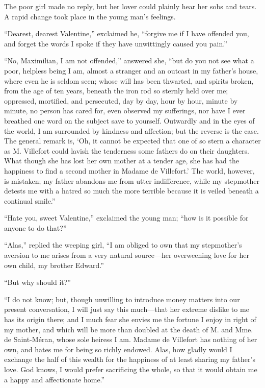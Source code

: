 The poor girl made no reply, but her lover could plainly hear her sobs
and tears. A rapid change took place in the young man’s feelings.

“Dearest, dearest Valentine,” exclaimed he, “forgive me if I have
offended you, and forget the words I spoke if they have unwittingly
caused you pain.”

“No, Maximilian, I am not offended,” answered she, “but do you not see
what a poor, helpless being I am, almost a stranger and an outcast in
my father’s house, where even he is seldom seen; whose will has been
thwarted, and spirits broken, from the age of ten years, beneath the
iron rod so sternly held over me; oppressed, mortified, and persecuted,
day by day, hour by hour, minute by minute, no person has cared for,
even observed my sufferings, nor have I ever breathed one word on the
subject save to yourself. Outwardly and in the eyes of the world, I am
surrounded by kindness and affection; but the reverse is the case. The
general remark is, ‘Oh, it cannot be expected that one of so stern a
character as M. Villefort could lavish the tenderness some fathers do
on their daughters. What though she has lost her own mother at a tender
age, she has had the happiness to find a second mother in Madame de
Villefort.’ The world, however, is mistaken; my father abandons me from
utter indifference, while my stepmother detests me with a hatred so
much the more terrible because it is veiled beneath a continual smile.”

“Hate you, sweet Valentine,” exclaimed the young man; “how is it
possible for anyone to do that?”

“Alas,” replied the weeping girl, “I am obliged to own that my
stepmother’s aversion to me arises from a very natural source—her
overweening love for her own child, my brother Edward.”

“But why should it?”

“I do not know; but, though unwilling to introduce money matters into
our present conversation, I will just say this much—that her extreme
dislike to me has its origin there; and I much fear she envies me the
fortune I enjoy in right of my mother, and which will be more than
doubled at the death of M. and Mme. de Saint-Méran, whose sole heiress
I am. Madame de Villefort has nothing of her own, and hates me for
being so richly endowed. Alas, how gladly would I exchange the half of
this wealth for the happiness of at least sharing my father’s love. God
knows, I would prefer sacrificing the whole, so that it would obtain me
a happy and affectionate home.”


